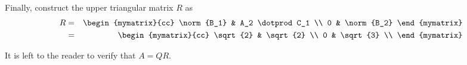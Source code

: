 \begin{solution}
Finally, construct the upper triangular matrix $R$ as
\begin{eqnarray*}
R &=&
\begin{mymatrix}{cc}
\norm{B_1} & A_2 \dotprod C_1  \\
0 & \norm{B_2}
\end{mymatrix} \\
&=&
\begin{mymatrix}{cc}
\sqrt{2} & \sqrt{2} \\
0 & \sqrt{3} \\
\end{mymatrix}
\end{eqnarray*}

It is left to the reader to verify that $A=QR$.
\end{solution}
